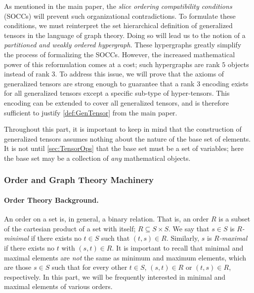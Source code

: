 \documentclass{article}
\theoremstyle{plain}
\theoremstyle{definition}
\theoremstyle{remark}
\let\oldparagraph\paragraph
\renewcommand{\paragraph}[1]{%
	\vspace{-0.5em}%
	\oldparagraph{#1}%
}
\begin{document}
As mentioned in the main paper, the \textit{slice ordering compatibility conditions} (SOCCs) will prevent such organizational contradictions. To formulate these conditions, we must reinterpret the set hierarchical definition of generalized tensors in the language of graph theory. Doing so will lead us to the notion of a \textit{partitioned and weakly ordered hypergraph}. These hypergraphs greatly simplify the process of formalizing the SOCCs. However, the increased mathematical power of this reformulation comes at a cost; such hypergraphs are rank $5$ objects instead of rank $3$. To address this issue, we will prove that the axioms of generalized tensors are strong enough to guarantee that a rank $3$ encoding exists for all generalized tensors except a specific sub-type of hyper-tensors. This encoding can be extended to cover all generalized tensors, and is therefore sufficient to justify \cref{def:GenTensor} from the main paper.

Throughout this part, it is important to keep in mind that the construction of generalized tensors assumes nothing about the nature of the base set of elements. It is not until \cref{sec:TensorOps} that the base set must be a set of variables; here the base set may be a collection of \textit{any} mathematical objects.

\subsubsection{\label{sec:Machinery_Apdx}Order and Graph Theory Machinery}

\paragraph{Order Theory Background.} An order on a set is, in general, a binary relation. That is, an order $R$ is a subset of the cartesian product of a set with itself; $R \subseteq S \times S$. We say that $s \in S$ is \textit{$R$-minimal} if there exists no $t \in S$ such that $(t, s) \in R$. Similarly, $s$ is \textit{$R$-maximal} if there exists no $t$ with $(s, t) \in R$. It is important to recall that minimal and maximal elements are \textit{not} the same as minimum and maximum elements, which are those $s \in S$ such that for every other $t \in S$, $(s, t) \in R$ or $(t, s) \in R$, respectively. In this part, we will be frequently interested in minimal and maximal elements of various orders.
\end{document}
